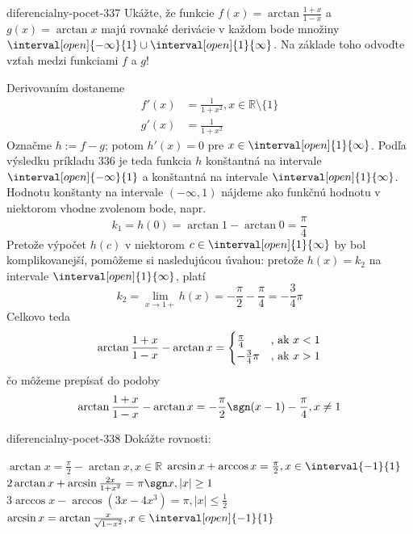 \begin{defproblem}{diferencialny-pocet-337}
Ukážte, že funkcie $f(x)=\arctan \frac{1+x}{1-x}$ a $g(x)=\arctan x$ majú
rovnaké derivácie v každom bode množiny $\interval[open]{-\infty}{1} \cup
\interval[open]{1}{\infty}$. Na základe toho odvoďte vzťah medzi funkciami $f$ a
$g$!

\begin{solution}
  Derivovaním dostaneme
  \begin{align*}
    f'(x) &= \frac{1}{1+x^2},x\in\mathbb{R}\setminus \{1\} \\
    g'(x) &= \frac{1}{1+x^2}
  \end{align*}
  Označme $h:=f-g$; potom $h'(x)=0$ pre $x\in \interval[open]{1}{\infty}$. Podľa
  výsledku príkladu $336$ je teda funkcia $h$ konštantná na intervale
  $\interval[open]{-\infty}{1}$ a konštantná na intervale
  $\interval[open]{1}{\infty}$. Hodnotu konštanty na intervale $(-\infty,1)$
  nájdeme ako funkčnú hodnotu v niektorom vhodne zvolenom bode, napr.
  \[
    k_1=h(0)=\arctan 1- \arctan 0=\frac{\pi}{4}
  \]
  Pretože výpočet $h(c)$ v niektorom $c\in \interval[open]{1}{\infty}$ by bol
  komplikovanejší, pomôžeme si nasledujúcou úvahou: pretože $h(x)=k_2$ na
  intervale $\interval[open]{1}{\infty}$, platí
  \[
    k_2=\lim_{x\rightarrow 1+}h(x)=-\frac{\pi}{2}-\frac{\pi}{4}=-\frac{3}{4}\pi
  \]
  Celkovo teda
  \[
    \arctan \frac{1+x}{1-x}-\arctan x =
    \begin{cases}
      \frac{\pi}{4}    & $,  ak $ x<1 \\
      -\frac{3}{4}\pi  & $, ak $ x>1
    \end{cases}
  \]
  čo môžeme prepísať do podoby
  \[
    \arctan \frac{1+x}{1-x}-\arctan x
    = -\frac{\pi}{2} \sgn (x-1)-\frac{\pi}{4},x \neq 1
  \]

\end{solution}
\end{defproblem}

\begin{defproblem}{diferencialny-pocet-338}
Dokážte rovnosti:
\begin{tasks}
\task $\arctan x=\frac{\pi}{2}-\arctan x,x \in \mathbb{R}$
\task $\arcsin x+\arccos x=\frac{\pi}{2},x \in \interval{-1}{1}$
\task $2\arctan x+\arcsin \frac{2x}{1+x^2}=\pi \sgn x,|x|\geq 1$
\task $3\arccos x-\arccos (3x-4x^3)=\pi ,|x|\leq \frac{1}{2}$
\task $\arcsin x=\arctan \frac{x}{\sqrt{1-x^2}},x\in \interval[open]{-1}{1}$
\end{tasks}
\end{defproblem}

